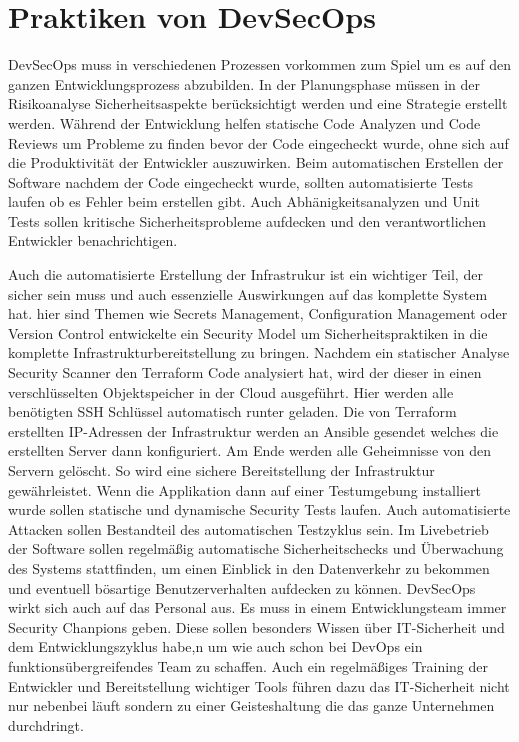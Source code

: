 \section{Praktiken von DevSecOps}
DevSecOps muss in verschiedenen Prozessen vorkommen zum Spiel um es auf den ganzen Entwicklungsprozess abzubilden.
In der Planungsphase müssen in der Risikoanalyse Sicherheitsaspekte berücksichtigt werden und eine Strategie erstellt werden.
Während der Entwicklung helfen statische Code Analyzen und Code Reviews um Probleme zu finden bevor der Code eingecheckt wurde, ohne sich auf die Produktivität der Entwickler auszuwirken.
Beim automatischen Erstellen der Software nachdem der Code eingecheckt wurde, sollten automatisierte Tests laufen ob es Fehler beim erstellen gibt. Auch Abhänigkeitsanalyzen und Unit Tests sollen kritische Sicherheitsprobleme aufdecken und den verantwortlichen Entwickler benachrichtigen.

Auch die automatisierte Erstellung der Infrastrukur ist ein wichtiger Teil, der sicher sein muss und auch essenzielle Auswirkungen auf das komplette System hat.
hier sind Themen wie Secrets Management, Configuration Management oder Version Control \cite{grey}
\cite{security-model} entwickelte ein Security Model um Sicherheitspraktiken in die komplette Infrastrukturbereitstellung zu bringen. Nachdem ein statischer Analyse Security Scanner den Terraform Code analysiert hat, wird der dieser in einen verschlüsselten Objektspeicher in der Cloud ausgeführt. Hier werden alle benötigten SSH Schlüssel automatisch runter geladen. Die von Terraform erstellten IP-Adressen der Infrastruktur werden an Ansible gesendet welches die erstellten Server dann konfiguriert. Am Ende werden alle Geheimnisse von den Servern gelöscht. So wird eine sichere Bereitstellung der Infrastruktur gewährleistet.
Wenn die Applikation dann auf einer Testumgebung installiert wurde sollen statische und dynamische Security Tests laufen. Auch automatisierte Attacken sollen Bestandteil des automatischen Testzyklus sein.
Im Livebetrieb der Software sollen regelmäßig automatische Sicherheitschecks und Überwachung des Systems stattfinden, um einen Einblick in den Datenverkehr zu bekommen und eventuell bösartige Benutzerverhalten aufdecken zu können.
DevSecOps wirkt sich auch auf das Personal aus. Es muss in einem Entwicklungsteam immer \glqq Security Chanpions\grqq \cite{grey} geben. Diese sollen besonders Wissen über IT-Sicherheit und dem Entwicklungszyklus habe,n um wie auch schon bei DevOps ein funktionsübergreifendes Team zu schaffen.
Auch ein regelmäßiges Training der Entwickler und Bereitstellung wichtiger Tools führen dazu das IT-Sicherheit nicht nur nebenbei läuft sondern zu einer Geisteshaltung die das ganze Unternehmen durchdringt.

